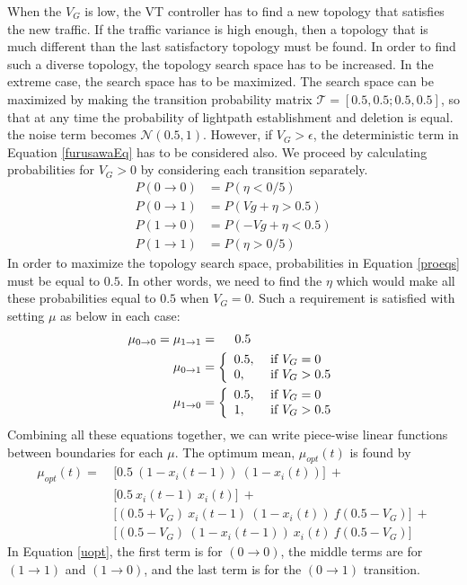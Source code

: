 \documentclass[conference]{IEEEtran}
\begin{document}
When the $V_G$ is low, the VT controller has to find a new topology that satisfies the new traffic. 
If the traffic variance is high enough, then a topology that is much different than the last satisfactory topology must be found. 
In order to find such a diverse topology, the topology search space has to be increased. In the extreme case, the search space has to be maximized.
The search space can be maximized by making the transition probability matrix $\mathcal{T}=[0.5, 0.5; 0.5, 0.5]$, so that at any time the probability of lightpath establishment and deletion is equal.
the noise term becomes $\mathcal{N}(0.5,1)$.
However, if $V_G > \epsilon$, the deterministic term in Equation \ref{furusawaEq} has to be considered also. 
We proceed by calculating probabilities for $V_G > 0$ by considering each transition separately. 
 \begin{align} \label{proeqs}
P(0\rightarrow0) &=  P(\eta < 0/5) \\  
P(0\rightarrow1) &=  P( Vg + \eta >0.5) \\
P(1\rightarrow0) &=  P (- Vg + \eta < 0.5) \\
P(1\rightarrow1) &=  P(\eta>0/5)   
  \end{align}  
In order to maximize the topology search space, probabilities in Equation   \ref{proeqs}  must be equal to $0.5$. 
In other words, we need to find the $\eta$ which would make all these probabilities equal to $0.5$ when $V_G=0$.
 Such a requirement is satisfied with setting   $\mu$ as below in each case:
  \begin{align}
  \centering
  \mu_{0\rightarrow0}  =\mu_{1\rightarrow1} & =  \hskip 0.46cm    0.5   \\
  \mu_{0\rightarrow1}& =    \left\{ \begin{array}{ll}
   0.5, &\mbox{ if $V_G=0$} \\
   0, &\mbox{ if $V_G>0.5$}
       \end{array} \right. \\
 \mu_{1\rightarrow0} & =  \left\{ \begin{array}{ll}
  0.5, &\mbox{ if $V_G=0$} \\
  1, &\mbox{ if $V_G>0.5$}
       \end{array} \right.\end{align}         
Combining all these equations together, we can write piece-wise linear functions between boundaries for each $\mu$.
The optimum mean, $\mu_{opt}(t)$ is found by 
 \begin{align} \label{uopt}
\mu_{opt}(t ) =\: &  \Big[ 0.5\: (1-x_i(t-1)) \: (1-x_i(t)) \Big] \: + \\ &  \Big[0.5 \: x_i(t-1)\: x_i(t) \Big] \:+ \nonumber\\
&  \Big[ (0.5 + V_G)  \: x_i(t-1) \: (1-x_i(t))  \: f(0.5-V_G)\Big] \: + \nonumber \\ &\Big[(0.5 - V_G) \:(1-x_i(t-1)) \: x_i(t)  \: f(0.5-V_G) \Big]\nonumber
\end{align}  
\normalsize
In Equation \ref{uopt}, the first term is for $(0\rightarrow0)$, the middle terms are for $(1\rightarrow1)$ and  $(1\rightarrow0)$, and the last term is for the $(0\rightarrow1)$ transition.
\end{document}
